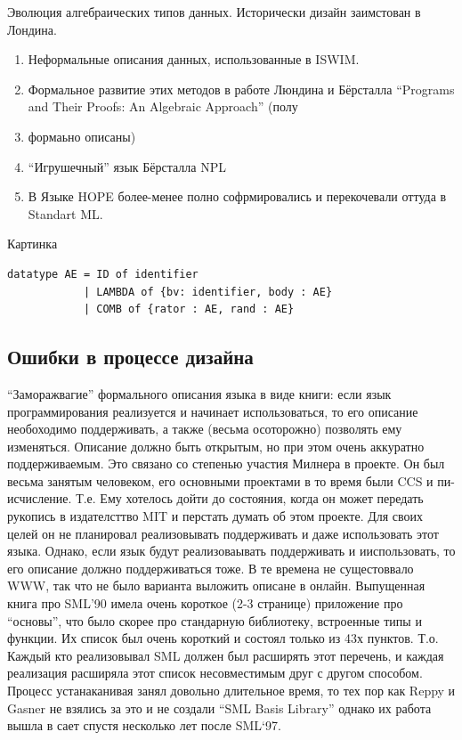 \documentclass[14pt]{matmex-diploma-custom}
\begin{document}
\begin{itemize}
\begin{itemize}
Эволюция алгебраических типов данных.
Исторически дизайн заимстован в Лондина. 
\begin{enumerate}
\item Неформальные описания данных, использованные в ISWIM.
\item Формальное развитие этих методов в работе Люндина и Бёрсталла “Programs and Their Proofs: An Algebraic Approach” (полу \item формаьно описаны)
\item “Игрушечный” язык Бёрсталла NPL
\item В Языке HOPE более-менее полно софрмировались и перекочевали оттуда в Standart ML.
\end{enumerate}



Картинка
\begin{verbatim}
datatype AE = ID of identifier
            | LAMBDA of {bv: identifier, body : AE}
            | COMB of {rator : AE, rand : AE}
\end{verbatim}

\subsection{Ошибки в процессе дизайна}
“Заморажвагие” формального описания языка в виде книги: если язык программирования реализуется и начинает использоваться, то его описание необоходимо поддерживать, а также (весьма осоторожно) позволять ему изменяться. Описание должно быть открытым, но при этом очень аккуратно поддерживаемым.
Это связано со степенью участия Милнера в проекте. Он был весьма занятым человеком, его основными проектами в то время были CCS и пи-исчисление. Т.е. Ему хотелось дойти до состояния, когда он может передать рукопись в издателсттво MIT  и перстать думать об этом проекте. Для своих целей он не планировал реализовывать поддерживать и даже использовать этот языка. Однако, если язык будут реализоваывать поддерживать и ииспользовать, то его описание должно поддерживаться тоже. В те времена не сущестоввало WWW, так что не было варианта выложить описане в онлайн.
Выпущенная книга про SML’90 имела очень короткое (2-3 странице) приложение про “основы”, что было скорее про стандарную библиотеку, встроенные типы и функции. Их список был очень короткий и состоял только из 43х пунктов. Т.о. Каждый кто реализовывал SML должен был расширять этот перечень, и каждая реализация расширяла этот список несовместимым друг с другом способом. Процесс устанаканивая занял довольно длительное время, то тех пор как Reppy и Gasner не взялись  за это и не создали “SML Basis Library” однако их работа вышла в сает спустя несколько лет после SML‘97.


\end{itemize}
\end{itemize}
\end{document}
